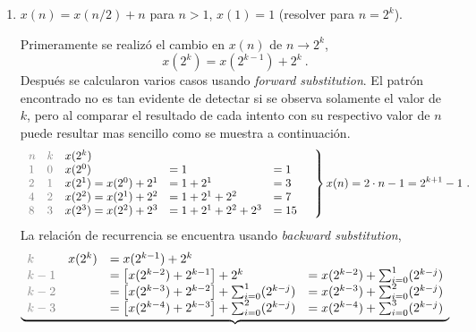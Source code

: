 \begin{enumerate}[label=\textbf{\alph*.}]
    \item $x(n) = x(n/2) + n$ para $n > 1$, $x(1) = 1$ (resolver para $n = 2^k$).
    \begin{solution}
        Primeramente se realizó el cambio en $x(n)$ de $n \to 2^k$,
        \begin{equation*}
            x(2^k) = x(2^{k - 1}) + 2^k\ .
        \end{equation*}
        Después se calcularon varios casos usando \textit{forward substitution}. El patrón encontrado no es tan evidente de detectar si se observa solamente el valor de $k$, pero al comparar el resultado de cada intento con su respectivo valor de $n$ puede resultar mas sencillo como se muestra a continuación.
        \begin{equation*}
            \begin{rcases}
                \begin{array}{l l l l l}
                    \txtgray{n} & \txtgray{k} & x(2^k) & & \\
                    \txtgray{1} & \txtgray{0} & x(2^0) & = 1 & = 1 \\
                    \txtgray{2} & \txtgray{1} & x(2^1) = x(2^0) + 2^1 & = 1 + 2^1 & = 3 \\
                    \txtgray{4} & \txtgray{2} & x(2^2) = x(2^1) + 2^2 & = 1 + 2^1 + 2^2 & = 7 \\
                    \txtgray{8} & \txtgray{3} & x(2^3) = x(2^2) + 2^3 & = 1 + 2^1 + 2^2 + 2^3 & = 15
                \end{array} \quad
            \end{rcases}
            x(n) = \dprod{2}{n} - 1 = 2^{k + 1} - 1\ .
        \end{equation*}
        La relación de recurrencia se encuentra usando \textit{backward substitution},
        \begin{equation*}
            \underbrace{%
            \begin{array}{l l l l}
                \txtgray{k} & x(2^k) & = x(2^{k - 1}) + 2^k & \\
                \txtgray{k - 1} & & = \left[x(2^{k - 2}) + 2^{k - 1}\right] + 2^k & = x(2^{k - 2}) + \sum_{i=0}^{1} (2^{k - j}) \\
                \txtgray{k - 2} & & = \left[x(2^{k - 3}) + 2^{k - 2}\right] + \sum_{i=0}^{1} (2^{k - j}) & = x(2^{k - 3}) + \sum_{i=0}^{2} (2^{k - j}) \\
                \txtgray{k - 3} & & = \left[x(2^{k-4}) + 2^{k - 3}\right] + \sum_{i=0}^{2} (2^{k - j}) & = x(2^{k - 4}) + \sum_{i=0}^{3} (2^{k - j}) \\

\end{array}}
\end{equation*}
\end{solution}
\end{enumerate}
